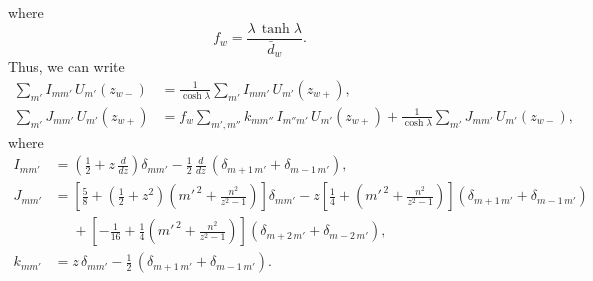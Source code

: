 \documentclass[12pt,prb,aps,notitlepage]{revtex4-1}
\begin{document}
where
\begin{equation}
f_w= \frac{\lambda\,\tanh\lambda}{\bar{d}_w}.
\end{equation}
Thus, we can write
\begin{align}
\sum_{m'}I_{mm'}\,U_{m'}(z_{w-}) &= \frac{1}{\cosh\lambda}\sum_{m'}I_{mm'}\,U_{m'}(z_{w+}),\\[0.5ex]
\sum_{m'}J_{mm'}\,U_{m'}(z_{w+})&= f_w\sum_{m',m''}k_{mm''}\,I_{m''m'}\,U_{m'}(z_{w+}) + \frac{1}{\cosh\lambda}\sum_{m'}J_{mm'}\,U_{m'}(z_{w-}),
\end{align}
where
\begin{align}
I_{mm'}&= \left(\frac{1}{2}+z\,\frac{d}{dz}\right)\delta_{mm'}-\frac{1}{2}\,\frac{d}{dz}\,(\delta_{m+1\,m'}+\delta_{m-1\,m'}),\\[0.5ex]
J_{mm'}&= \left[\frac{5}{8} + \left(\frac{1}{2}+z^2\right)\left(m'^{\,2}+\frac{n^2}{z^2-1}\right)\right]\delta_{mm'}
-z\left[\frac{1}{4}+ \left(m'^{\,2}+\frac{n^2}{z^2-1}\right)\right](\delta_{m+1\,m'}+\delta_{m-1\,m'})\nonumber\\[0.5ex]
&\phantom{=}+\left[-\frac{1}{16}+\frac{1}{4} \left(m'^{\,2}+\frac{n^2}{z^2-1}\right)\right](\delta_{m+2\,m'}+\delta_{m-2\,m'}),\\[0.5ex]
k_{mm'} &= z\,\delta_{mm'} - \frac{1}{2}\,(\delta_{m+1\,m'}+\delta_{m-1\,m'}).
\end{align}
\end{document}
